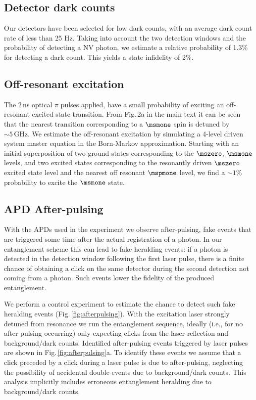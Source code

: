 \subsection{Detector dark counts}
Our detectors have been selected for low dark counts, with an average dark count rate of less than 25 Hz. Taking into account the two detection windows and the probability of detecting a NV photon, we estimate a relative probability of 1.3\% for detecting a dark count. This yields a state infidelity of 2\%.

\subsection{Off-resonant excitation}
The 2\,ns optical $\pi$ pulses applied, have a small probability of exciting an off-resonant excited state transition. From Fig.\,2a in the main text it can be seen that the nearest transition corresponding to a $\msmone$ spin is detuned by $\sim 5\,\mathrm{GHz}$. We estimate the off-resonant excitation by simulating a 4-level driven system master equation in the Born-Markov approximation. Starting with an initial superposition of two ground states  corresponding to the $\mszero$, $\msmone$ levels, and two excited states corresponding to the resonantly driven $\mszero$ excited state level and the nearest off resonant $\mspmone$ level, we find a $\sim 1\%$ probability to excite the $\msmone$ state.

\subsection{APD After-pulsing}

With the APDs used in the experiment we observe after-pulsing, fake events that are triggered some time after the actual registration of a photon. In our entanglement scheme this can lead to fake heralding events: if a photon is detected in the detection window following the first laser pulse, there is a finite chance of obtaining a click on the same detector during the second detection not coming from a photon. Such events lower the fidelity of the produced entanglement. %

We perform a control experiment to estimate the chance to detect such fake heralding events (Fig.\,\ref{fig:afterpulsing}). With the excitation laser strongly detuned from resonance we run the entanglement sequence, ideally (i.e., for no after-pulsing occurring) only expecting clicks from the laser reflection and background/dark counts. Identified after-pulsing events triggered by laser pulses are shown in Fig.\,\ref{fig:afterpulsing}a. To identify these events we assume that a click preceded by a click during a laser pulse is due to after-pulsing, neglecting the possibility of accidental double-events due to background/dark counts. This analysis implicitly includes erroneous entanglement heralding due to background/dark counts.

